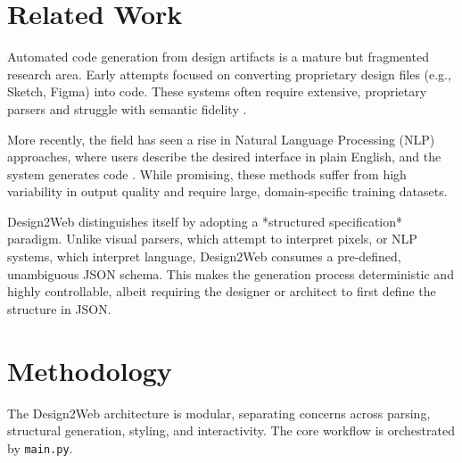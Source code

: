 \documentclass[11pt,a4paper]{article}
\begin{document}
\section{Related Work}
Automated code generation from design artifacts is a mature but fragmented research area. Early attempts focused on converting proprietary design files (e.g., Sketch, Figma) into code. These systems often require extensive, proprietary parsers and struggle with semantic fidelity \cite{figma_to_code}.

More recently, the field has seen a rise in Natural Language Processing (NLP) approaches, where users describe the desired interface in plain English, and the system generates code \cite{nlp_to_code}. While promising, these methods suffer from high variability in output quality and require large, domain-specific training datasets.

Design2Web distinguishes itself by adopting a *structured specification* paradigm. Unlike visual parsers, which attempt to interpret pixels, or NLP systems, which interpret language, Design2Web consumes a pre-defined, unambiguous JSON schema. This makes the generation process deterministic and highly controllable, albeit requiring the designer or architect to first define the structure in JSON.

\section{Methodology}
The Design2Web architecture is modular, separating concerns across parsing, structural generation, styling, and interactivity. The core workflow is orchestrated by \texttt{main.py}.
\end{document}
